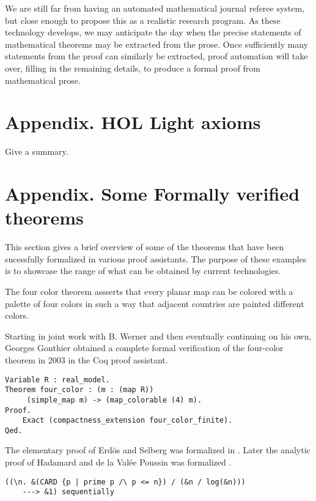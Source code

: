 \documentclass[brochure,english,12pt]{bourbaki}
\theoremstyle{plain}
\begin{document}
We are still far from having an automated mathematical journal referee system, but close enough
to propose this as a realistic research program.
As these technology develops, we may anticipate the day when the precise statements of mathematical
theorems may be extracted from the prose.  Once sufficiently many statements from the proof 
can similarly be extracted, proof automation will take over, filling in the remaining details, to produce
a formal proof from mathematical prose.  


\section{Appendix. HOL Light axioms}

Give a summary.


\section{Appendix. Some Formally verified theorems}


This section gives a brief overview of some of the theorems that have been sucessfully formalized
in various proof assistants.  The purpose of these examples is to showcase the range
of what can be obtained by current technologies.


The four color theorem assserts that every planar map can be colored with a palette of four colors in such a way that adjacent
countries are painted different colors.

Starting in joint work with B. Werner and then eventually continuing on his own,
Georges Gonthier obtained a complete formal verification of the four-color theorem in 2003 in
the Coq proof assistant.

\begin{lstlisting}[keepspaces=true,stringstyle=\tt,basicstyle=\small,frame=single,framesep=8pt,morekeywords={Variable,Theorem,Proof,Qed},columns=flexible,caption={Four-color theorem in Coq}]
Variable R : real_model. 
Theorem four_color : (m : (map R))
     (simple_map m) -> (map_colorable (4) m). 
Proof.
    Exact (compactness_extension four_color_finite). 
Qed.
\end{lstlisting}


The elementary proof of Erd\"os and Selberg was formalized in \cite{XX}.  Later the analytic proof of Hadamard and de la Val\'ee Poussin
was formalized \cite{XX}.

\begin{lstlisting}[keepspaces=true,stringstyle=\tt,basicstyle=\small,frame=single,framesep=8pt,mathescape,morekeywords={theorem,fixes,assumes,defines,shows,Variable,Theorem,Proof,Qed},columns=flexible,caption={The prime number theorem}]
  ((\n. &(CARD {p | prime p /\ p <= n}) / (&n / log(&n)))
    ---> &1) sequentially
\end{lstlisting}
\end{document}
